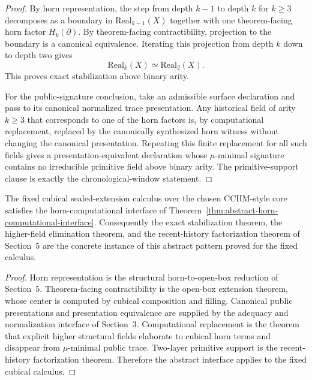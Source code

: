 \begin{proof}
By horn representation, the step from depth \(k-1\) to depth \(k\) for \(k\geq 3\) decomposes
as a boundary in \(\mathrm{Real}_{k-1}(X)\) together with one theorem-facing horn factor
\(H_k(\partial)\).  By theorem-facing contractibility, projection to the boundary is a
canonical equivalence.  Iterating this projection from depth \(k\) down to depth two gives
\[
  \mathrm{Real}_k(X) \simeq \mathrm{Real}_2(X).
\]
This proves exact stabilization above binary arity.

For the public-signature conclusion, take an admissible surface declaration and pass to its
canonical normalized trace presentation.  Any historical field of arity \(k\geq 3\) that
corresponds to one of the horn factors is, by computational replacement, replaced by the
canonically synthesized horn witness without changing the canonical presentation.  Repeating
this finite replacement for all such fields gives a presentation-equivalent declaration whose
\(\mu\)-minimal signature contains no irreducible primitive field above binary arity.  The
primitive-support clause is exactly the chronological-window statement.
\end{proof}

\begin{corollary}
\label{cor:fixed-cubical-instantiation}
The fixed cubical sealed-extension calculus over the chosen CCHM-style core satisfies the
horn-computational interface of
Theorem~\ref{thm:abstract-horn-computational-interface}.  Consequently the exact
stabilization theorem, the higher-field elimination theorem, and the recent-history
factorization theorem of Section~5 are the concrete instance of this abstract pattern proved
for the fixed calculus.
\end{corollary}

\begin{proof}
Horn representation is the structural horn-to-open-box reduction of Section~5.
Theorem-facing contractibility is the open-box extension theorem, whose center is computed by
cubical composition and filling.  Canonical public presentations and presentation equivalence
are supplied by the adequacy and normalization interface of Section~3.  Computational
replacement is the theorem that explicit higher structural fields elaborate to cubical horn
terms and disappear from \(\mu\)-minimal public trace.  Two-layer primitive support is the
recent-history factorization theorem.  Therefore the abstract interface applies to the fixed
cubical calculus.
\end{proof}

